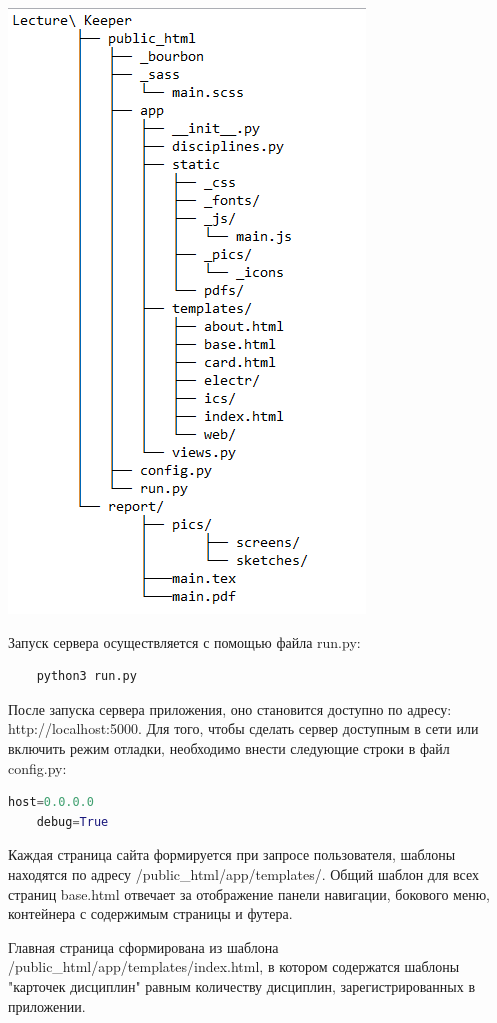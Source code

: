 \includegraphics{codes/file_struct.png}

Запуск сервера осуществляется с помощью файла run.py:

\begin{lstlisting}
	python3 run.py
\end{lstlisting}

После запуска сервера приложения, оно становится доступно по адресу: http://localhost:5000. Для того, чтобы сделать сервер доступным в сети или включить режим отладки, необходимо внести следующие строки в файл config.py:

\begin{lstlisting}[language=Python]
	host=0.0.0.0
	debug=True
\end{lstlisting}

Каждая страница сайта формируется при запросе пользователя, шаблоны находятся по адресу /public\_html/app/templates/. Общий шаблон для всех страниц base.html отвечает за отображение панели навигации, бокового меню, контейнера с содержимым страницы и футера.

Главная страница сформирована из шаблона /public\_html/app/templates/index.html, в котором содержатся шаблоны "карточек дисциплин" равным количеству дисциплин, зарегистрированных в приложении.

